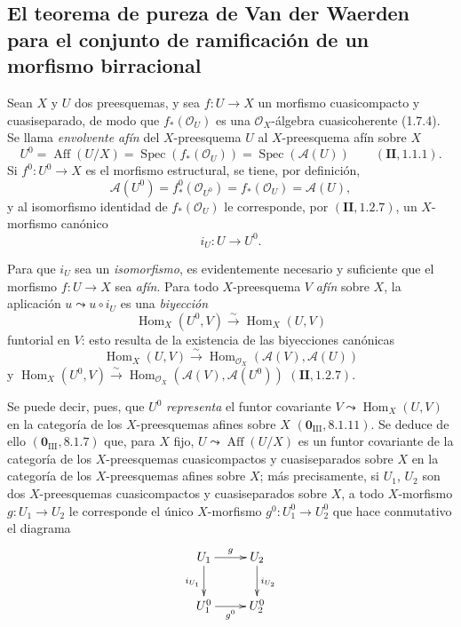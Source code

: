 \subsection{El teorema de pureza de Van der Waerden para el conjunto de
ramificación de un morfismo birracional}
\label{subsection:IV.21.12}
\label{IV.21.12}

\begin{env}[21.12.1]
\label{IV.21.12.1}
Sean $X$ y $U$ dos preesquemas, y sea $f:U\to X$ un morfismo cuasicompacto y
cuasiseparado, de modo que $f_*(\mathcal O_U)$ es una $\mathcal O_X$-álgebra
cuasicoherente (1.7.4). Se llama \emph{envolvente afín} del $X$-preesquema $U$ al
$X$-preesquema afín sobre $X$
\[
  U^0=\operatorname{Aff}(U/X)=\operatorname{Spec}(f_*(\mathcal O_U))
  =\operatorname{Spec}(\mathscr A(U))\qquad(\mathbf{II}, 1.1.1).
\]
Si $f^0:U^0\to X$ es el morfismo estructural, se tiene, por definición,
\[
  \mathscr A(U^0)=f^0_*(\mathcal O_{U^0})=f_*(\mathcal O_U)=\mathscr A(U),
\]
y al isomorfismo identidad de $f_*(\mathcal O_U)$ le corresponde, por
$(\mathbf{II}, 1.2.7)$, un $X$-morfismo canónico
\[
\label{IV.21.12.1.1}
  i_U:U\to U^0.
  \tag{21.12.1.1}
\]

Para que $i_U$ sea un \emph{isomorfismo}, es evidentemente necesario y suficiente que el
morfismo $f:U\to X$ sea \emph{afín}. Para todo $X$-preesquema $V$ \emph{afín} sobre
$X$, la aplicación $u\leadsto u\circ i_U$ es una \emph{biyección}
\[
  \operatorname{Hom}_X(U^0,V)\xrightarrow{\sim}\operatorname{Hom}_X(U,V)
\]
funtorial en $V$: esto resulta de la existencia de las biyecciones canónicas
\[
  \operatorname{Hom}_X(U,V)\xrightarrow{\sim}
  \operatorname{Hom}_{\mathcal O_X}(\mathscr A(V),\mathscr A(U))
\]
y
$\operatorname{Hom}_X(U^0,V)\xrightarrow{\sim}
\operatorname{Hom}_{\mathcal O_X}(\mathscr A(V),\mathscr A(U^0))$
$(\mathbf{II}, 1.2.7)$.

Se puede decir, pues, que $U^0$ \emph{representa} el funtor covariante
$V\leadsto\operatorname{Hom}_X(U,V)$ en la categoría de los $X$-preesquemas afines sobre
$X$ $(\mathbf 0_{\mathrm{III}}, 8.1.11)$. Se deduce de ello
$(\mathbf 0_{\mathrm{III}}, 8.1.7)$ que, para $X$ fijo,
$U\leadsto\operatorname{Aff}(U/X)$ es un funtor covariante de la categoría de los
$X$-preesquemas cuasicompactos y cuasiseparados sobre $X$ en la categoría de los
$X$-preesquemas afines sobre $X$; más precisamente, si $U_1$, $U_2$ son dos
$X$-preesquemas cuasicompactos y cuasiseparados sobre $X$, a todo $X$-morfismo
$g:U_1\to U_2$ le corresponde el único $X$-morfismo $g^0:U_1^0\to U_2^0$ que hace
conmutativo el diagrama
\[
  \xymatrix{
    U_1 \ar[r]^g \ar[d]_{i_{U_1}} & U_2 \ar[d]^{i_{U_2}} \\
    U_1^0 \ar[r]_{g^0} & U_2^0
  }
\]
\end{env}

